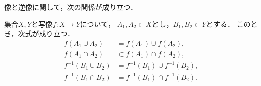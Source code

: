     像と逆像に関して，次の関係が成り立つ．
    \begin{thm} \label{thm:mapcupcap}
      集合$X,  Y$と写像$f: X \longrightarrow Y$について，
      $A_1,  A_2 \subset X$とし，$B_1 ,  B_2 \subset Y$とする．
      このとき，次式が成り立つ．
      \begin{align}
        f(A_1 \cup A_2) & = f(A_1) \cup f(A_2),
        \label{eq:A1A2cup} \\
        f(A_1 \cap A_2) & \subset f(A_1 ) \cap f(A_2), 
        \label{eq:A1A2cap} \\
        f^{-1}(B_1 \cup B_2) & = f^{-1} (B_1 ) \cup f^{-1} (B_2),
        \label{eq:B1B2cup} \\
        f^{-1} (B_1 \cap B_2 ) & = f^{-1} (B_1) \cap f^{-1} (B_2).
        \label{eq:B1B2cap} 
      \end{align}
    \end{thm}

